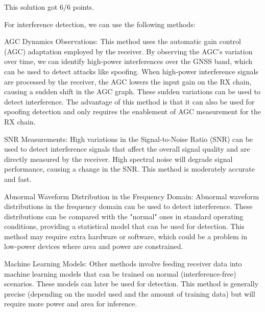 \begin{solution}
    This solution got 6/6 points.

    For interference detection, we can use the following methods:

    AGC Dynamics Observations: This method uses the automatic gain control (AGC) adaptation employed by the receiver. By observing the AGC's variation over time, we can identify high-power interferences over the GNSS band, which can be used to detect attacks like spoofing. When high-power interference signals are processed by the receiver, the AGC lowers the input gain on the RX chain, causing a sudden shift in the AGC graph. These sudden variations can be used to detect interference. The advantage of this method is that it can also be used for spoofing detection and only requires the enablement of AGC measurement for the RX chain.

    SNR Measurements: High variations in the Signal-to-Noise Ratio (SNR) can be used to detect interference signals that affect the overall signal quality and are directly measured by the receiver. High spectral noise will degrade signal performance, causing a change in the SNR. This method is moderately accurate and fast.

    Abnormal Waveform Distribution in the Frequency Domain: Abnormal waveform distributions in the frequency domain can be used to detect interference. These distributions can be compared with the "normal" ones in standard operating conditions, providing a statistical model that can be used for detection. This method may require extra hardware or software, which could be a problem in low-power devices where area and power are constrained.

    Machine Learning Models: Other methods involve feeding receiver data into machine learning models that can be trained on normal (interference-free) scenarios. These models can later be used for detection. This method is generally precise (depending on the model used and the amount of training data) but will require more power and area for inference.
\end{solution}



